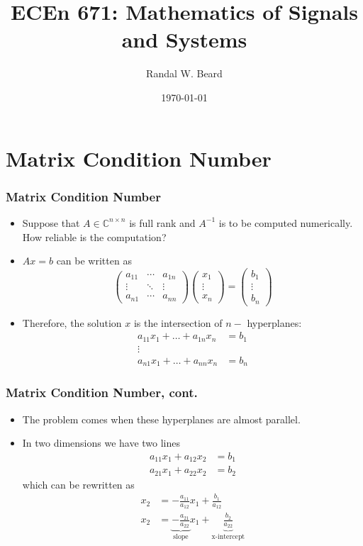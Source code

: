 \documentclass{beamer}
\title{ECEn 671: Mathematics of Signals and Systems}
\author{Randal W. Beard}
\institute{Brigham Young University}
\date{\today}
\begin{document}
\begin{frame}
	\titlepage
\end{frame}

\section{Matrix Condition Number}
\frame{\sectionpage}

\begin{frame}\frametitle{Matrix Condition Number}
	\begin{itemize}
	\item 	Suppose that $A \in \mathbb{C}^{n \times n}$ is full rank and $A^{-1}$ is to be computed numerically.  How reliable is the computation?
	\item $Ax = b$ can be written as 
		\[
			\begin{pmatrix}
   	 			a_{11} & \cdots & a_{1n}\\
    			\vdots & \ddots & \vdots\\
    			a_{n1} & \cdots & a_{nn}
    		\end{pmatrix}
    		\begin{pmatrix}
    			x_1 \\ \vdots \\ x_n
    		\end{pmatrix}
			=
			\begin{pmatrix}
				b_1 \\ \vdots \\ b_n	
			\end{pmatrix}
		\]
	\item Therefore, the solution $x$ is the intersection of $n-$ hyperplanes:
		\begin{align*}
		a_{11}x_1 + \ldots + a_{1n}x_n &= b_1\\
		\vdots\\
		a_{n1}x_1 + \ldots + a_{nn}x_n &= b_n
		\end{align*}
	\end{itemize}
\end{frame}

\begin{frame}\frametitle{Matrix Condition Number, cont.}
	\begin{itemize}
		\item The problem comes when these hyperplanes are almost parallel.
		\item In two dimensions we have two lines
			\begin{align*}
				a_{11}x_1 + a_{12}x_2 &= b_1\\
				a_{21}x_1 + a_{22}x_2 &= b_2
			\end{align*}
			which can be rewritten as
			\begin{align*}
  				x_2 &= -\frac{a_{11}}{a_{12}}x_1 + \frac{b_1}{a_{12}}\\
  				x_2 &= \underbrace{-\frac{a_{21}}{a_{22}}}_{\text{slope}}x_1 + \underbrace{\frac{b_2}{a_{22}}}_{\text{x-intercept}} 
			\end{align*}
	\end{itemize}
\end{frame}
\end{document}
